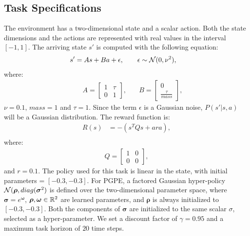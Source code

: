 \subsection*{Task Specifications} 
The environment has a two-dimensional state and a scalar action. 
Both the state dimensions and the actions are represented with real values in the interval $[-1, 1]$. The arriving state $s'$ is computed with the following equation:
\begin{align}
s' &= As + Ba + \epsilon, \qquad \epsilon\sim\mathcal{N}(0,\nu^2),\nonumber
\end{align}
where:
\begin{align}
&\quad A =
\begin{bmatrix}
1 & \tau \\
0 & 1 
\end{bmatrix}, &\quad 
B =
\begin{bmatrix}
0 \\
\frac{\tau}{mass} 
\end{bmatrix},\nonumber
\end{align}
$\nu=0.1$, $mass=1$ and $\tau = 1$.
Since the term $\epsilon$ is a Gaussian noise, $P(s'|s,a)$ will be a Gaussian distribution.
The reward function is:
\begin{align}
R(s) &= - (s^TQs + ara),\nonumber\\
\end{align}
where:
\begin{align}
Q =
\begin{bmatrix}
1 & 0 \\
0 & 0
\end{bmatrix},
\end{align}
and $r = 0.1 $.
The policy used for this task is linear in the state, with initial parameters = $[-0.3, -0.3]$. For \ac{PGPE}, a factored Gaussian hyper-policy $\mathcal{N}(\boldsymbol{\rho},\mathop{diag}(\boldsymbol{\sigma}^2)$ is defined over the two-dimensional parameter space, where $\boldsymbol{\sigma}=e^{\boldsymbol{\omega}}$, $\boldsymbol{\rho},\boldsymbol{\omega}\in\mathbb{R}^2$ are learned parameters, and $\boldsymbol{\rho}$ is always initialized to $[-0.3,-0.3]$. Both the components of $\boldsymbol{\sigma}$ are initialized to the same scalar $\sigma$, selected as a hyper-parameter. 
We set a discount factor of $\gamma=0.95$ and a maximum task horizon of $20$ time steps.
%
